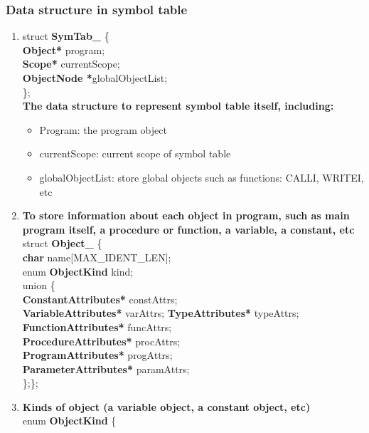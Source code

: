 \documentclass[12pt, a4paper]{report}
\begin{document}
				\subsubsection{Data structure in symbol table}
					\begin{enumerate}
						\item struct \textbf{SymTab\_} \{\\
	  					\textbf{Object*} program;\\
	  					\textbf{Scope*} currentScope;\\
	  					\textbf{ObjectNode *}globalObjectList;\\
						\};\\
						\textbf{The data structure to represent symbol table itself, including:}
						\begin{itemize}
							\item Program: the program object
	    					\item currentScope: current scope of symbol table
	    					\item globalObjectList: store global objects such as functions: CALLI, WRITEI, etc 
						\end{itemize}
						\item \textbf{To store information about each object in program, such as main program itself, a procedure or function, a variable, a constant, etc}\\
						struct \textbf{Object\_} \{\\
  						\textbf{char} name[MAX\_IDENT\_LEN];\\
  						enum \textbf{ObjectKind} kind;\\
  						union \{\\
    					\textbf{ConstantAttributes*} constAttrs;\\
    					\textbf{VariableAttributes*} varAttrs;
    					\textbf{TypeAttributes*} typeAttrs;\\
    					\textbf{FunctionAttributes*} funcAttrs;\\
    					\textbf{ProcedureAttributes*} procAttrs;\\
    					\textbf{ProgramAttributes*} progAttrs;\\
    					\textbf{ParameterAttributes*} paramAttrs;\\
 						\};\};	\\
 						\item \textbf{Kinds of object (a variable object, a constant object, etc)}\\
 						enum \textbf{ObjectKind} \{\\

\end{enumerate}
\end{document}

